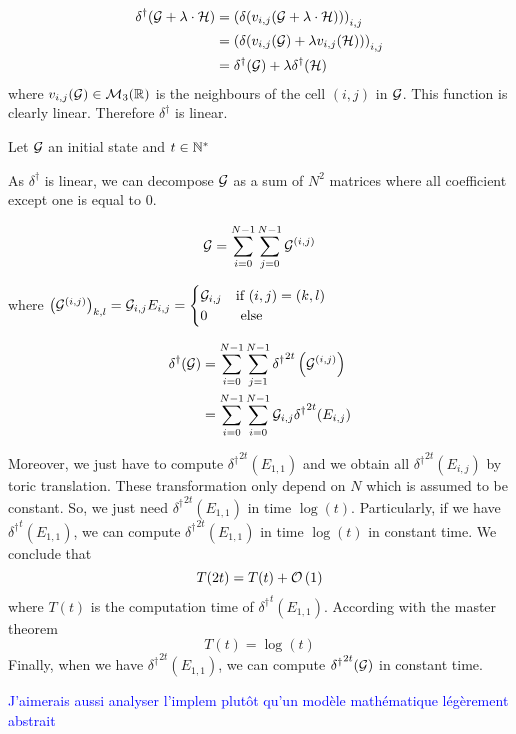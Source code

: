 $$
    \begin{aligned}
        \delta^\dagger(\mathcal{G}+\lambda\cdot\mathcal{H}) &= \left( \delta(v_{i,j}(\mathcal{G}+\lambda\cdot\mathcal{H})) \right)_{i,j}\\
        &= \left( \delta(v_{i,j}(\mathcal{G})+\lambda v_{i,j}(\mathcal{H})) \right)_{i,j}\\
        &= \delta^\dagger(\mathcal{G})+\lambda \delta^\dagger(\mathcal{H})
    \end{aligned}
$$
where $v_{i,j}(\mathcal{G}) \in \mathcal{M}_3(\mathbb{R})$ is the neighbours of the cell $(i,j)$ in $\mathcal{G}$. This function is clearly linear. Therefore $\delta^\dagger$ is linear.

Let $\mathcal{G}$ an initial state and $t\in\mathbb{N}^*$

As $\delta^\dagger$ is linear, we can decompose $\mathcal{G}$ as a sum of $N^2$ matrices where all coefficient except one is equal to 0. 

$$
    \mathcal{G}=\sum\limits_{i=0}^{N-1}\sum\limits_{j=0}^{N-1} \mathcal{G}^{(i,j)}
$$

where $\left(\mathcal{G}^{(i,j)}\right)_{k,l}=\mathcal{G}_{i,j}E_{i,j}=\begin{cases} \mathcal{G}_{i,j} & \text{if }(i,j)=(k,l)\\0&\text{ else} \end{cases}$

$$
    \begin{aligned}
        \delta^\dagger(\mathcal{G}) &= \sum\limits_{i=0}^{N-1}\sum\limits_{j=1}^{N-1} {\delta^\dagger}^{2t}\left(\mathcal{G}^{(i,j)}\right)\\
        &= \sum\limits_{i=0}^{N-1} \sum\limits_{i=0}^{N-1} \mathcal{G}_{i,j} {\delta^\dagger}^{2t}(E_{i,j})
    \end{aligned}
$$

Moreover, we just have to compute ${\delta^\dagger}^{2t}(E_{1,1})$ and we obtain all ${\delta^\dagger}^{2t}(E_{i,j})$ by toric translation. These transformation only depend on $N$ which is assumed to be constant. So, we just need ${\delta^\dagger}^{2t}(E_{1,1})$ in time $\log(t)$. Particularly, if we have ${\delta^\dagger}^{t}(E_{1,1})$, we can compute ${\delta^\dagger}^{2t}(E_{1,1})$ in time $\log(t)$ in constant time. We conclude that
$$
    T(2t) = T(t) + \mathcal O \left( 1 \right)
$$
where $T(t)$ is the computation time of ${\delta^\dagger}^t(E_{1,1})$. According with the master theorem
$$
    T(t)=\log(t)
$$
Finally, when we have ${\delta^\dagger}^{2t}(E_{1,1})$, we can compute ${\delta^\dagger}^{2t}(\mathcal{G})$ in constant time.

\textcolor{blue}{J'aimerais aussi analyser l'implem plutôt qu'un modèle mathématique légèrement abstrait}



